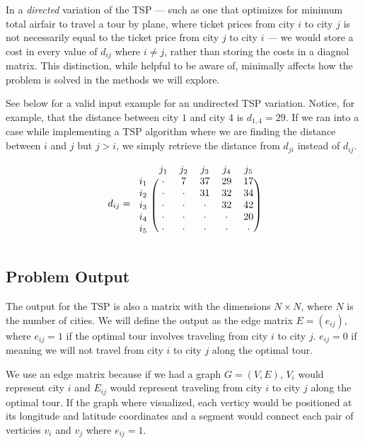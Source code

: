 \documentclass[11pt,fleqn]{article}
\begin{document}
In a \textit{directed} variation of the TSP --- such as one that
optimizes for minimum total airfair to travel a tour by plane,
where ticket prices from city $i$ to city $j$ is not necessarily
equal to the ticket price from city $j$ to city $i$ --- we would
store a cost in every value of $d_{ij}$ where $i\neq j$, rather
than storing the costs in a diagnol matrix.  This distinction,
while helpful to be aware of, minimally affects how the problem is
solved in the methods we will explore.
\par

See below for a valid input example for an undirected TSP variation.
Notice, for example, that the distance between city $1$ and city $4$ is
$d_{1,4}=29$.  If we ran into a case while implementing a TSP algorithm
where we are finding the distance between $i$ and $j$ but $j>i$, we
simply retrieve the distance from $d_{ji}$ instead of $d_{ij}$.
\par

\begin{align*}
  d_{ij}=
  \begin{blockarray}{cccccc}
    & j_1 & j_2 & j_3 & j_4 & j_5 \\
  \begin{block}{c(ccccc)}
    i_1 & \cdot & 7 & 37 & 29 & 17 \\
    i_2 & \cdot & \cdot & 31 & 32 & 34 \\
    i_3 & \cdot & \cdot & \cdot & 32 & 42 \\
    i_4 & \cdot & \cdot & \cdot & \cdot & 20 \\
    i_5 & \cdot & \cdot & \cdot & \cdot & \cdot \\
  \end{block}
  \end{blockarray}
\end{align*}

\subsection{Problem Output}
The output for the TSP is also a matrix with the dimensions
$N\times N$, where $N$ is the number of cities.  We will define the output as
the edge matrix $E = (e_{ij})$, where $e_{ij}=1$ if the optimal tour involves
traveling from city $i$ to city $j$.  $e_{ij}=0$ if meaning we will not
travel from city $i$ to city $j$ along the optimal tour.
\par

We use an edge matrix because if we had a graph $G=(V,E)$, $V_i$
would represent city $i$ and $E_{ij}$ would
represent traveling from city $i$ to city $j$ along the optimal tour.
If the graph where visualized, each verticy would be positioned at its
longitude and latitude coordinates and a segment would connect each pair
of verticies $v_i$ and $v_j$ where $e_{ij}=1$.
\par
\end{document}

